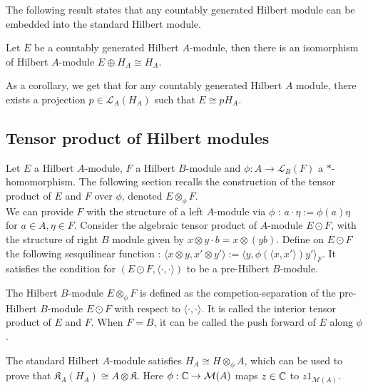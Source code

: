 
The following result states that any countably generated Hilbert module can be embedded into the standard Hilbert module.

\begin{thm}[Stabilization]
Let $E$ be a countably generated Hilbert $A$-module, then there is an isomorphism of Hilbert $A$-module $E\oplus H_A \cong H_A$.
\end{thm}

As a corollary, we get that for any countably generated Hilbert $A$ module, there exists a projection $p\in \mathcal L_A(H_A)$ such that $E\cong p H_A$.

\subsection{Tensor product of Hilbert modules}

Let $E$ a Hilbert $A$-module, $F$ a Hilbert $B$-module and $\phi : A \rightarrow \mathcal L_B(F)$ a $*$-homomorphism. The following section recalls the construction of the tensor product of $E$ and $F$ over $\phi$, denoted $E\otimes_\phi F$.\\

We can provide $F$ with the structure of a left $A$-module via $\phi$ : $a\cdot \eta := \phi(a)\eta$ for $a\in A,\eta\in F$. Consider the algebraic tensor product of $A$-module $E\odot F$, with the structure of right $B$ module given by $x\otimes y \cdot b = x\otimes (yb)$. Define on $E\odot F$ the following sesquilinear function : $\langle x \otimes y , x'\otimes y'\rangle := \langle y, \phi(\langle x, x'\rangle)y'\rangle_F $. It satisfies the condition for $(E\odot F,\langle \cdot , \cdot \rangle )$ to be a pre-Hilbert $B$-module.

\begin{definition}
The Hilbert $B$-module $E\otimes_\phi F$ is defined as the competion-separation of the pre-Hilbert $B$-module $E\odot F$ with respect to $\langle \cdot , \cdot \rangle$. It is called the interior tensor product of $E$ and $F$. When $F=B$, it can be called the push forward of $E$ along $\phi$.
\end{definition} 

\begin{Expl}
The standard Hilbert $A$-module satisfies $H_A \cong H\otimes_\phi A$, which can be used to prove that $\mathfrak K_A(H_A) \cong A\otimes \mathfrak K$. Here $\phi : \mathbb C\rightarrow \mathcal M(A)$ maps $z\in \mathbb C$ to $z1_{\mathcal M(A)}$.
\end{Expl}

